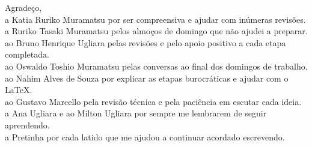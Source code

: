 \begin{agradecimentos}

	\noindent Agradeço,\\[2mm]
	a Katia Ruriko Muramatsu por ser compreensiva e ajudar com inúmeras revisões.\\[2mm]
	a Ruriko Tasaki Muramatsu pelos almoços de domingo que não ajudei a preparar.\\[2mm]
	ao Bruno Henrique Ugliara pelas revisões e pelo apoio positivo a cada etapa completada.\\[2mm]
	ao Oswaldo Toshio Muramatsu pelas conversas ao final dos domingos de trabalho.\\[2mm]
	ao Nahim Alves de Souza por explicar as etapas burocráticas e ajudar com o \LaTeX.\\[2mm]
	ao Gustavo Marcello pela revisão técnica e pela paciência em escutar cada ideia.\\[2mm]
	a Ana Ugliara e ao Milton Ugliara por sempre me lembrarem de seguir aprendendo.\\[2mm]
	a Pretinha por cada latido que me ajudou a continuar acordado escrevendo.
\end{agradecimentos}
